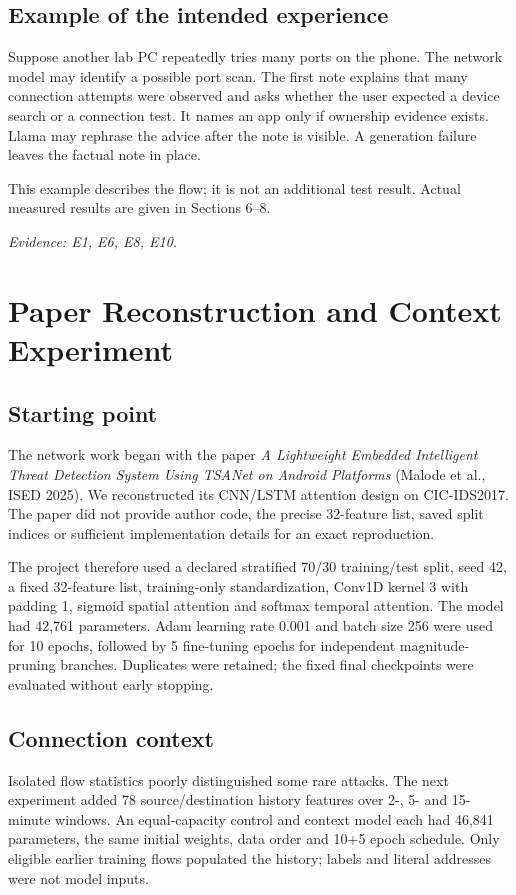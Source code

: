 \documentclass[11pt,a4paper]{article}
\newcommand{\source}[1]{{\small\textit{Evidence: #1.}\par}}
\newcommand{\chapterpage}[1]{\clearpage\section{#1}}
\begin{document}
\subsection*{Example of the intended experience}
Suppose another lab PC repeatedly tries many ports on the phone. The network model may
identify a possible port scan. The first note explains that many connection attempts were
observed and asks whether the user expected a device search or a connection test.
It names an app only if ownership evidence exists. Llama may rephrase the advice after
the note is visible. A generation failure leaves the factual note in place.

This example describes the flow; it is not an additional test result.
Actual measured results are given in Sections 6--8.
\source{E1, E6, E8, E10}

\chapterpage{Paper Reconstruction and Context Experiment}
\subsection*{Starting point}
The network work began with the paper \textit{A Lightweight Embedded Intelligent Threat
Detection System Using TSANet on Android Platforms} (Malode et al., ISED 2025).
We reconstructed its CNN/LSTM attention design on CIC-IDS2017. The paper did not provide
author code, the precise 32-feature list, saved split indices or sufficient implementation
details for an exact reproduction.

The project therefore used a declared stratified 70/30 training/test split, seed 42,
a fixed 32-feature list, training-only standardization, Conv1D kernel 3 with padding 1,
sigmoid spatial attention and softmax temporal attention. The model had 42,761 parameters.
Adam learning rate 0.001 and batch size 256 were used for 10 epochs, followed by
5 fine-tuning epochs for independent magnitude-pruning branches. Duplicates were retained;
the fixed final checkpoints were evaluated without early stopping.

\subsection*{Connection context}
Isolated flow statistics poorly distinguished some rare attacks. The next experiment
added 78 source/destination history features over 2-, 5- and 15-minute windows.
An equal-capacity control and context model each had 46,841 parameters, the same initial
weights, data order and 10+5 epoch schedule. Only eligible earlier training flows populated
the history; labels and literal addresses were not model inputs.
\end{document}

